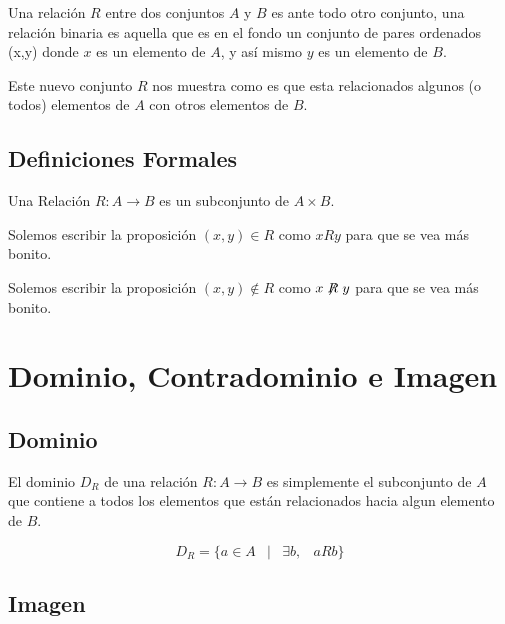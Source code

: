 \documentclass[12pt]{report}                                    %
\DeclareMathOperator \Space {\quad}                             %
\DeclareMathOperator \MiniSpace {\;}                            %
\newcommand \Such {\MiniSpace|\MiniSpace}                       %
\begin{document}
        Una relación $R$ entre dos conjuntos $A$ y $B$ es ante todo otro conjunto, una relación binaria es aquella
        que es en el fondo un conjunto de pares ordenados (x,y) donde $x$ es un elemento de $A$, y así mismo
        $y$ es un elemento de $B$.

        Este nuevo conjunto $R$ nos muestra como es que esta relacionados algunos (o todos) elementos de $A$ con
        otros elementos de $B$.



        \subsection*{Definiciones Formales}

            Una Relación $R: A \to B$ es un subconjunto de $A \times B$.

            Solemos escribir la proposición $(x, y) \in R$ como $x R y$ para que se vea más bonito.

            Solemos escribir la proposición $(x, y) \notin R$ como $x\centernot{R}y$ para que se vea más bonito.





    \clearpage
    \section{Dominio, Contradominio e Imagen}
            
        \subsection*{Dominio}

            El dominio $D_R$ de una relación $R : A \to B$ es simplemente el subconjunto de $A$ que
            contiene a todos los elementos que están relacionados hacia algun elemento de $B$.

            \begin{equation}
                D_R = \{ a \in A \Such \exists b, \MiniSpace aRb \}
            \end{equation}

        \subsection*{Imagen}
\end{document}

